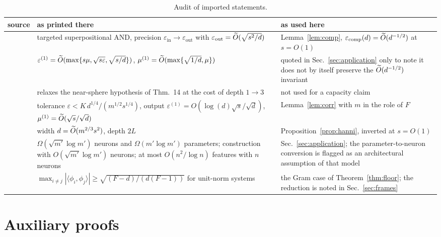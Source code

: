 \begin{table}[h]
\centering
\caption{Audit of imported statements.}
\label{tab:imported}
\small
\begin{tabular}{p{3.1cm}p{4.6cm}p{4.6cm}}
\toprule
source & as printed there & as used here \\
\midrule
\cite[Thm.~11]{hanni2024superposition} &
targeted superpositional AND, precision $\varepsilon_{\mathrm{in}}\to\varepsilon_{\mathrm{out}}$
with $\varepsilon_{\mathrm{out}}=\widetilde{O}(\sqrt{s^2/d})$ &
Lemma~\ref{lem:comp}, $\varepsilon_{\mathrm{comp}}(d)=\widetilde{O}(d^{-1/2})$ at $s=O(1)$ \\
\addlinespace[2pt]
\cite[Thm.~14]{hanni2024superposition} &
$\varepsilon^{(1)}=\widetilde{O}(\max\{s\mu,\sqrt{s\varepsilon},\sqrt{s/d}\})$,
$\mu^{(1)}=\widetilde{O}(\max\{\sqrt{1/d},\mu\})$ &
quoted in Sec.~\ref{sec:application} only to note it does not by itself preserve the
$\widetilde{O}(d^{-1/2})$ invariant \\
\addlinespace[2pt]
\cite[Cor.~15]{hanni2024superposition} &
relaxes the near-sphere hypothesis of Thm.~14 at the cost of depth $1\to3$ &
not used for a capacity claim \\
\addlinespace[2pt]
\cite[Thm.~21]{hanni2024superposition} &
tolerance $\varepsilon<K\,d^{1/4}/(m^{1/2}s^{1/4})$, output
$\varepsilon^{(1)}=O(\log(d)\sqrt{s}/\sqrt d)$, $\mu^{(1)}=\widetilde{O}(\sqrt s/\sqrt d)$ &
Lemma~\ref{lem:corr} with $m$ in the role of $F$ \\
\addlinespace[2pt]
\cite[Thm.~8]{hanni2024superposition} &
width $d=\widetilde{O}(m^{2/3}s^2)$, depth $2L$ &
Proposition~\ref{prop:hanni}, inverted at $s=O(1)$ \\
\addlinespace[2pt]
\cite{adler2024superposition} &
$\Omega(\sqrt{m'}\log m')$ neurons and $\Omega(m'\log m')$ parameters; construction with
$O(\sqrt{m'}\log m')$ neurons; at most $O(n^2/\log n)$ features with $n$ neurons &
Sec.~\ref{sec:application}; the parameter-to-neuron conversion is flagged as an architectural
assumption of that model \\
\addlinespace[2pt]
\cite[Thm.~2.3]{strohmer2003grassmannian} &
$\max_{i\neq j}|\langle\phi_i,\phi_j\rangle|\ge\sqrt{(F-d)/(d(F-1))}$ for unit-norm systems &
the Gram case of Theorem~\ref{thm:floor}; the reduction is noted in Sec.~\ref{sec:frames} \\
\bottomrule
\end{tabular}
\end{table}

\section{Auxiliary proofs}
\label{app:proofs}

